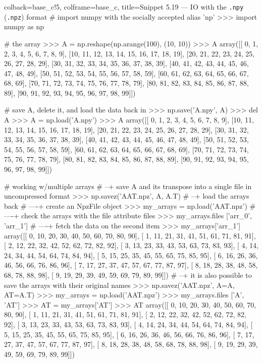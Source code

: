 \documentclass[a4paper,11pt]{book}
\numberwithin{figure}{chapter}
\numberwithin{table}{chapter}
\begin{document}
\begin{pythoncode}[linenos=true,]{colback=base_c!5, colframe=base_c, title=\sffamily Snippet 5.19 --- IO with the \texttt{.npy} (\texttt{.npz}) format}
# import numpy with the socially accepted alias 'np'
>>> import numpy as np

# the array
>>> A = np.reshape(np.arange(100), (10, 10))
>>> A
array([[ 0,  1,  2,  3,  4,  5,  6,  7,  8,  9],
       [10, 11, 12, 13, 14, 15, 16, 17, 18, 19],
       [20, 21, 22, 23, 24, 25, 26, 27, 28, 29],
       [30, 31, 32, 33, 34, 35, 36, 37, 38, 39],
       [40, 41, 42, 43, 44, 45, 46, 47, 48, 49],
       [50, 51, 52, 53, 54, 55, 56, 57, 58, 59],
       [60, 61, 62, 63, 64, 65, 66, 67, 68, 69],
       [70, 71, 72, 73, 74, 75, 76, 77, 78, 79],
       [80, 81, 82, 83, 84, 85, 86, 87, 88, 89],
       [90, 91, 92, 93, 94, 95, 96, 97, 98, 99]])

# save A, delete it, and load the data back in
>>> np.save('A.npy', A)
>>> del A
>>> A = np.load('A.npy')
>>> A
array([[ 0,  1,  2,  3,  4,  5,  6,  7,  8,  9],
       [10, 11, 12, 13, 14, 15, 16, 17, 18, 19],
       [20, 21, 22, 23, 24, 25, 26, 27, 28, 29],
       [30, 31, 32, 33, 34, 35, 36, 37, 38, 39],
       [40, 41, 42, 43, 44, 45, 46, 47, 48, 49],
       [50, 51, 52, 53, 54, 55, 56, 57, 58, 59],
       [60, 61, 62, 63, 64, 65, 66, 67, 68, 69],
       [70, 71, 72, 73, 74, 75, 76, 77, 78, 79],
       [80, 81, 82, 83, 84, 85, 86, 87, 88, 89],
       [90, 91, 92, 93, 94, 95, 96, 97, 98, 99]])

# working w/multiple arrays
# --+ save A and its transpose into a single file in uncompressed format
>>> np.savez('AAT.npz', A, A.T)
# --+ load the arrays back
# ----+ create an NpzFile object
>>> my_arrays = np.load('AAT.npz')
# ----+ check the arrays with the file attribute files
>>> my_arrays.files
['arr_0', 'arr_1']
# ----+ fetch the data on the second item 
>>> my_arrays['arr_1']
array([[ 0, 10, 20, 30, 40, 50, 60, 70, 80, 90],
       [ 1, 11, 21, 31, 41, 51, 61, 71, 81, 91],
       [ 2, 12, 22, 32, 42, 52, 62, 72, 82, 92],
       [ 3, 13, 23, 33, 43, 53, 63, 73, 83, 93],
       [ 4, 14, 24, 34, 44, 54, 64, 74, 84, 94],
       [ 5, 15, 25, 35, 45, 55, 65, 75, 85, 95],
       [ 6, 16, 26, 36, 46, 56, 66, 76, 86, 96],
       [ 7, 17, 27, 37, 47, 57, 67, 77, 87, 97],
       [ 8, 18, 28, 38, 48, 58, 68, 78, 88, 98],
       [ 9, 19, 29, 39, 49, 59, 69, 79, 89, 99]])
# --+ it is also possible to save the arrays with their original names
>>> np.savez('AAT.npz', A=A, AT=A.T)
>>> my_arrays = np.load('AAT.npz')
>>> my_arrays.files
['A', 'AT']
>>> AT = my_arrays['AT']
>>> AT
array([[ 0, 10, 20, 30, 40, 50, 60, 70, 80, 90],
       [ 1, 11, 21, 31, 41, 51, 61, 71, 81, 91],
       [ 2, 12, 22, 32, 42, 52, 62, 72, 82, 92],
       [ 3, 13, 23, 33, 43, 53, 63, 73, 83, 93],
       [ 4, 14, 24, 34, 44, 54, 64, 74, 84, 94],
       [ 5, 15, 25, 35, 45, 55, 65, 75, 85, 95],
       [ 6, 16, 26, 36, 46, 56, 66, 76, 86, 96],
       [ 7, 17, 27, 37, 47, 57, 67, 77, 87, 97],
       [ 8, 18, 28, 38, 48, 58, 68, 78, 88, 98],
       [ 9, 19, 29, 39, 49, 59, 69, 79, 89, 99]])

\end{pythoncode}
\end{document}
